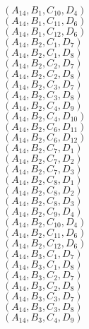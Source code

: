 \documentclass[14pt]{article}
\begin{document}
    $({A}_{14}, {B}_{1}, {C}_{10}, {D}_{4}) $ \\ 
    $({A}_{14}, {B}_{1}, {C}_{11}, {D}_{6}) $ \\ 
    $({A}_{14}, {B}_{1}, {C}_{12}, {D}_{6}) $ \\ 
    $({A}_{14}, {B}_{2}, {C}_{1}, {D}_{7}) $ \\ 
    $({A}_{14}, {B}_{2}, {C}_{1}, {D}_{8}) $ \\ 
    $({A}_{14}, {B}_{2}, {C}_{2}, {D}_{7}) $ \\ 
    $({A}_{14}, {B}_{2}, {C}_{2}, {D}_{8}) $ \\ 
    $({A}_{14}, {B}_{2}, {C}_{3}, {D}_{7}) $ \\ 
    $({A}_{14}, {B}_{2}, {C}_{3}, {D}_{8}) $ \\ 
    $({A}_{14}, {B}_{2}, {C}_{4}, {D}_{9}) $ \\ 
    $({A}_{14}, {B}_{2}, {C}_{4}, {D}_{10}) $ \\ 
    $({A}_{14}, {B}_{2}, {C}_{6}, {D}_{11}) $ \\ 
    $({A}_{14}, {B}_{2}, {C}_{6}, {D}_{12}) $ \\ 
    $({A}_{14}, {B}_{2}, {C}_{7}, {D}_{1}) $ \\ 
    $({A}_{14}, {B}_{2}, {C}_{7}, {D}_{2}) $ \\ 
    $({A}_{14}, {B}_{2}, {C}_{7}, {D}_{3}) $ \\ 
    $({A}_{14}, {B}_{2}, {C}_{8}, {D}_{1}) $ \\ 
    $({A}_{14}, {B}_{2}, {C}_{8}, {D}_{2}) $ \\ 
    $({A}_{14}, {B}_{2}, {C}_{8}, {D}_{3}) $ \\ 
    $({A}_{14}, {B}_{2}, {C}_{9}, {D}_{4}) $ \\ 
    $({A}_{14}, {B}_{2}, {C}_{10}, {D}_{4}) $ \\ 
    $({A}_{14}, {B}_{2}, {C}_{11}, {D}_{6}) $ \\ 
    $({A}_{14}, {B}_{2}, {C}_{12}, {D}_{6}) $ \\ 
    $({A}_{14}, {B}_{3}, {C}_{1}, {D}_{7}) $ \\ 
    $({A}_{14}, {B}_{3}, {C}_{1}, {D}_{8}) $ \\ 
    $({A}_{14}, {B}_{3}, {C}_{2}, {D}_{7}) $ \\ 
    $({A}_{14}, {B}_{3}, {C}_{2}, {D}_{8}) $ \\ 
    $({A}_{14}, {B}_{3}, {C}_{3}, {D}_{7}) $ \\ 
    $({A}_{14}, {B}_{3}, {C}_{3}, {D}_{8}) $ \\ 
    $({A}_{14}, {B}_{3}, {C}_{4}, {D}_{9}) $ \\ 
\end{document}
